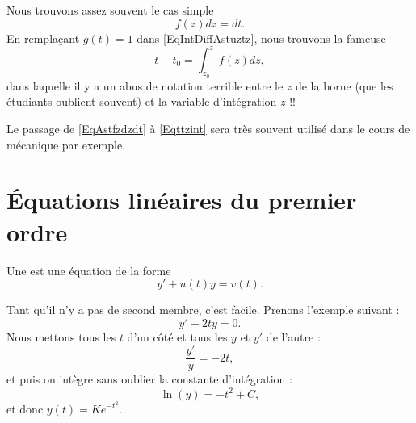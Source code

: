 Nous trouvons assez souvent le cas simple
\begin{equation}    \label{EqAstfzdzdt}
	f(z)dz=dt.
\end{equation}
En remplaçant \( g(t)=1\) dans \eqref{EqIntDiffAstuztz}, nous trouvons la fameuse
\begin{equation}        \label{Eqttzint}
	t-t_0=\int_{z_0}^zf(z)dz,
\end{equation}
dans laquelle il y a un abus de notation terrible entre le \( z\) de la borne (que les étudiants oublient souvent) et la variable d'intégration \( z\) !!

Le passage de \eqref{EqAstfzdzdt} à \eqref{Eqttzint} sera très souvent utilisé dans le cours de mécanique par exemple.

\section{Équations linéaires du premier ordre}

Une  est une équation de la forme
\begin{equation}
	y'+u(t)y=v(t).
\end{equation}

\begin{example}     \label{EXooVVLGooPWaHUI}
	Tant qu'il n'y a pas de second membre, c'est facile. Prenons l'exemple suivant :
	\begin{equation}
		y'+2ty=0.
	\end{equation}
	Nous mettons tous les \( t\) d'un côté et tous les \( y\) et \( y'\) de l'autre :
	\begin{equation}
		\frac{ y' }{ y }=-2t,
	\end{equation}
	et puis on intègre sans oublier la constante d'intégration :
	\begin{equation}
		\ln(y)=-t^2+C,
	\end{equation}
	et donc \( y(t)=K e^{-t^2}\).
\end{example}

